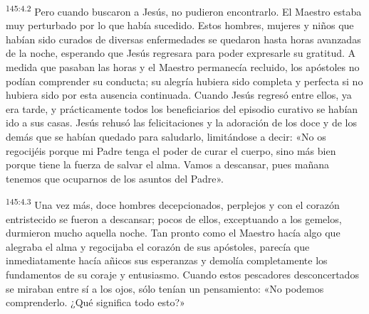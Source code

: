 \par
\textsuperscript{145:4.2} Pero cuando buscaron a Jesús, no pudieron encontrarlo. El Maestro estaba muy perturbado por lo que había sucedido. Estos hombres, mujeres y niños que habían sido curados de diversas enfermedades se quedaron hasta horas avanzadas de la noche, esperando que Jesús regresara para poder expresarle su gratitud. A medida que pasaban las horas y el Maestro permanecía recluido, los apóstoles no podían comprender su conducta; su alegría hubiera sido completa y perfecta si no hubiera sido por esta ausencia continuada. Cuando Jesús regresó entre ellos, ya era tarde, y prácticamente todos los beneficiarios del episodio curativo se habían ido a sus casas. Jesús rehusó las felicitaciones y la adoración de los doce y de los demás que se habían quedado para saludarlo, limitándose a decir: «No os regocijéis porque mi Padre tenga el poder de curar el cuerpo, sino más bien porque tiene la fuerza de salvar el alma. Vamos a descansar, pues mañana tenemos que ocuparnos de los asuntos del Padre».

\par
\textsuperscript{145:4.3} Una vez más, doce hombres decepcionados, perplejos y con el corazón entristecido se fueron a descansar; pocos de ellos, exceptuando a los gemelos, durmieron mucho aquella noche. Tan pronto como el Maestro hacía algo que alegraba el alma y regocijaba el corazón de sus apóstoles, parecía que inmediatamente hacía añicos sus esperanzas y demolía completamente los fundamentos de su coraje y entusiasmo. Cuando estos pescadores desconcertados se miraban entre sí a los ojos, sólo tenían un pensamiento: «No podemos comprenderlo. ¿Qué significa todo esto?»

